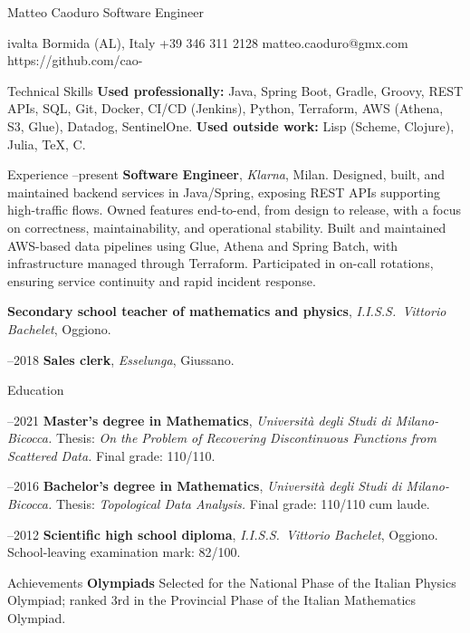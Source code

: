 \load[cv-mac]
\enlang

\name Matteo Caoduro
\cvtitle Software Engineer
\address Rivalta Bormida (AL), Italy
\phone +39 346 311 2128
\email matteo.caoduro@gmx.com
\git https://github.com/cao-

\cvsection Technical Skills
\cventry 
{\bf Used professionally:} Java, Spring Boot, Gradle, Groovy, REST APIs, SQL, Git, Docker, CI/CD (Jenkins), Python, Terraform, AWS (Athena, S3, Glue), Datadog, SentinelOne.\nl
{\bf Used outside work:} Lisp (Scheme, Clojure), Julia, \TeX, C.

\cvsection Experience
--present
{\bf Software Engineer}, {\it Klarna}, Milan.\nl
Designed, built, and maintained backend services in Java/Spring, exposing REST APIs supporting high-traffic flows.\nl
Owned features end-to-end, from design to release, with a focus on correctness, maintainability, and operational stability.\nl
Built and maintained AWS-based data pipelines using Glue, Athena and Spring Batch, with infrastructure managed through Terraform.\nl
Participated in on-call rotations, ensuring service continuity and rapid incident response.

{\bf Secondary school teacher of mathematics and physics}, {\it I.I.S.S.\ Vittorio Bachelet}, Oggiono.

--2018
{\bf Sales clerk}, {\it Esselunga}, Giussano.

\cvsection Education

--2021
{\bf Master's degree in Mathematics}, {\it Università degli Studi di Milano-Bicocca.}\nl
Thesis: {\it On the Problem of Recovering Discontinuous Functions from Scattered Data.}\nl
Final grade: 110/110.

--2016
{\bf Bachelor's degree in Mathematics}, {\it Università degli Studi di Milano-Bicocca.}\nl
Thesis: {\it Topological Data Analysis.}\nl
Final grade: 110/110 cum laude.

--2012
{\bf Scientific high school diploma}, {\it I.I.S.S.\ Vittorio Bachelet}, Oggiono.\nl
School-leaving examination mark: 82/100.

\cvsection Achievements
{\bf Olympiads}\nl
Selected for the National Phase of the Italian Physics Olympiad; ranked 3rd in the Provincial Phase of the Italian Mathematics Olympiad.

\bye

